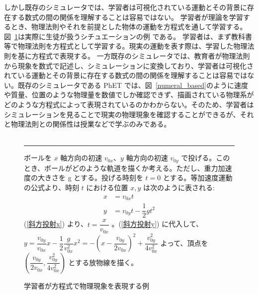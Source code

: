 しかし既存のシミュレータでは、学習者は可視化されている運動とその背景に存在する数式の間の関係を理解することは容易ではない。
学習者が理論を学習するとき、物理法則やそれを前提とした物体の運動を方程式を通して学習する。
図~\ref{symbol_based}は実際に生徒が扱うシチュエーションの例
である。
学習者は、まず教科書等で物理法則を方程式として学習する。現実の運動を表す際は、学習した物理法則を基に方程式で表現する。
一方既存のシミュレータでは、教育者が物理法則から現象を数式で記述し、シミュレーションに変換しており、学習者は可視化されている運動とその背景に存在する数式の間の関係を理解することは容易ではない。既存のシミュレータである PhET では、図~\ref{numeral_based}のように速度や質量、位置のような物理量を数値でしか確認できず、描画されている物理系がどのような方程式によって表現されているのかわからない。そのため、学習者はシミュレーションを見ることで現実の物理現象を確認することができるが、それと物理法則との関係性は授業などで学ぶのみである。\\\\


\begin{figure}[htb]
\noindent\rule{\linewidth}{0.4pt}

ボールを $x$ 軸方向の初速 $v_{0x}$、$y$ 軸方向の初速 $v_{0y}$ で投げる。このとき、ボールがどのような軌道を描くか考える。ただし、重力加速度の大きさを g とする。投げる時刻を $t=0$ とする。等加速度運動の公式より、時刻 $t$ における位置 $x, y$ は次のように表される:
\begin{align}
  x &= v_{0x}t \label{斜方投射x}\\
  y &= v_{0y}t - \dfrac{1}{2}gt^2 \label{斜方投射y}
\end{align}
(\ref{斜方投射x}) より、$t = \dfrac{x}{v_{0x}}$ 。(\ref{斜方投射y}) に代入して、$y = \dfrac{v_{0y}}{v_{0x}}x - \dfrac{1}{2}\dfrac{g}{v_{0x}^2}x^2 = - \left(x - \dfrac{v_{0y}}{2 v_{0x}}\right)^{2} + \dfrac{v_{0y}^{2}}{4 v_{0x}^{2}}$ よって、頂点を $\left(\dfrac{v_{0y}}{2 v_{0x}} ,\dfrac{v_{0y}^{2}}{4 v_{0x}^{2}}\right)$ とする放物線を描く。



\caption{学習者が方程式で物理現象を表現する例} \label{symbol_based}
\end{figure}

